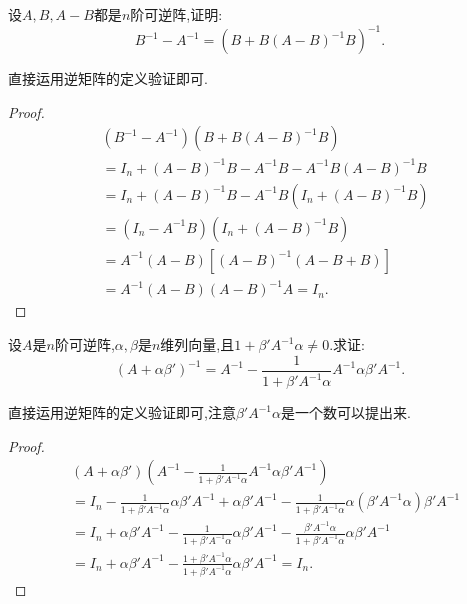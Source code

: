 \documentclass[../../main.tex]{subfiles}%
\begin{document}
\begin{proposition}\label{proposition:B^-1-A^-1用A和B表示}
设\(A,B,A - B\)都是\(n\)阶可逆阵,证明:
\[
B^{-1} - A^{-1} = (B + B(A - B)^{-1}B)^{-1}.
\]    
\end{proposition}
\begin{note}
直接运用逆矩阵的定义验证即可.
\end{note}
\begin{proof}
\begin{align*}
&\left( B^{-1}-A^{-1} \right) \left( B+B\left( A-B \right) ^{-1}B \right) 
\\
&=I_n+\left( A-B \right) ^{-1}B-A^{-1}B-A^{-1}B\left( A-B \right) ^{-1}B
\\
&=I_n+\left( A-B \right) ^{-1}B-A^{-1}B\left( I_n+\left( A-B \right) ^{-1}B \right) 
\\
&=\left( I_n-A^{-1}B \right) \left( I_n+\left( A-B \right) ^{-1}B \right) 
\\
&=A^{-1}\left( A-B \right) \left[ \left( A-B \right) ^{-1}\left( A-B+B \right) \right] 
\\
&=A^{-1}\left( A-B \right) \left( A-B \right) ^{-1}A=I_n.
\end{align*}
\end{proof}

\begin{proposition}\label{Sherman-Morrison公式}
设\(A\)是\(n\)阶可逆阵,\(\alpha,\beta\)是\(n\)维列向量,且\(1 + \beta'A^{-1}\alpha \neq 0\).求证:
\[
(A + \alpha\beta')^{-1} = A^{-1} - \frac{1}{1 + \beta'A^{-1}\alpha}A^{-1}\alpha\beta'A^{-1}.
\]
\end{proposition}
\begin{note}
直接运用逆矩阵的定义验证即可,注意$\beta'A^{-1}\alpha $是一个数可以提出来.
\end{note}
\begin{proof}
\begin{align*}
&\left( A+\alpha \beta ' \right) \left( A^{-1}-\frac{1}{1+\beta 'A^{-1}\alpha}A^{-1}\alpha \beta 'A^{-1} \right) 
\\
&=I_n-\frac{1}{1+\beta 'A^{-1}\alpha}\alpha \beta 'A^{-1}+\alpha \beta 'A^{-1}-\frac{1}{1+\beta 'A^{-1}\alpha}\alpha \left( \beta 'A^{-1}\alpha \right) \beta 'A^{-1}
\\
&=I_n+\alpha \beta 'A^{-1}-\frac{1}{1+\beta 'A^{-1}\alpha}\alpha \beta 'A^{-1}-\frac{\beta 'A^{-1}\alpha}{1+\beta 'A^{-1}\alpha}\alpha \beta 'A^{-1}
\\
&=I_n+\alpha \beta 'A^{-1}-\frac{1+\beta 'A^{-1}\alpha}{1+\beta 'A^{-1}\alpha}\alpha \beta 'A^{-1}=I_n.
\end{align*}
\end{proof}
\end{document}
